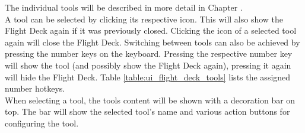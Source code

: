 
The individual tools will be described in more detail in Chapter . \\

A tool can be selected by clicking its respective icon. This will also show the Flight Deck again if it was previously closed.
Clicking the icon of a selected tool again will close the Flight Deck. Switching between tools can also be achieved by pressing
the number keys on the keyboard. Pressing the respective number key will show the tool (and possibly show the Flight Deck again),
pressing it again will hide the Flight Deck. Table \ref{table:ui_flight_deck_tools} lists the assigned number hotkeys. \\

When selecting a tool, the tools content will be shown with a decoration bar on top. The bar will show the selected tool's name 
and various action buttons for configuring the tool.

